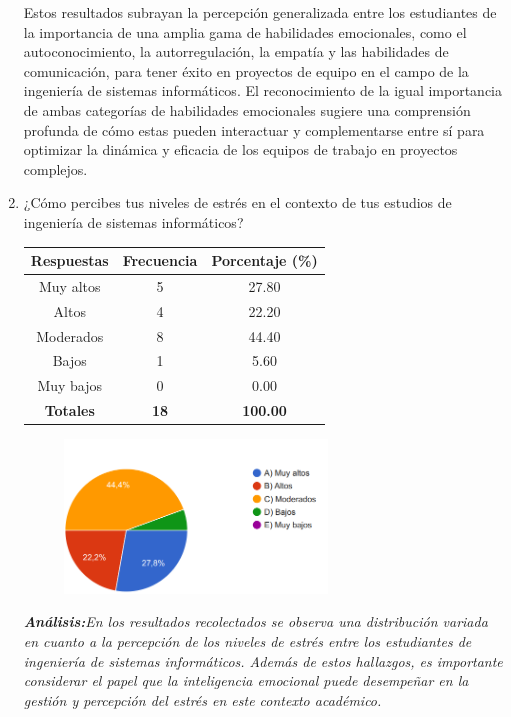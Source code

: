 \documentclass[journal]{IEEEtran}
\begin{document}
\begin{enumerate}
{Estos resultados subrayan la percepción generalizada entre los estudiantes de la importancia de una amplia gama de habilidades emocionales, como el autoconocimiento, la autorregulación, la empatía y las habilidades de comunicación, para tener éxito en proyectos de equipo en el campo de la ingeniería de sistemas informáticos.
El reconocimiento de la igual importancia de ambas categorías de habilidades emocionales sugiere una comprensión profunda de cómo estas pueden interactuar y complementarse entre sí para optimizar la dinámica y eficacia de los equipos de trabajo en proyectos complejos.
}\\

\item¿Cómo percibes tus niveles de estrés en el contexto de tus estudios de ingeniería de sistemas informáticos?
	\begin{table}[H]
		\renewcommand{\arraystretch}{1.3}
		\centering
		\begin{tabular}{|c|c|c|}
			\hline
			\textbf{Respuestas} & \textbf{Frecuencia} & \textbf{Porcentaje (\%)}\\
			\hline
			Muy altos & 5 & 27.80 \\
			Altos & 4 & 22.20 \\
			Moderados & 8 & 44.40\\
			Bajos & 1 & 5.60\\
			Muy bajos & 0 & 0.00\\
			\hline
			\textbf{Totales} &\textbf{18}& \textbf{100.00}\\
			\hline
		\end{tabular}
	\end{table}
	\begin{figure}[h]
		\centering
		\includegraphics[width=07cm]{Pregunta11}
	\end{figure}
	\textit{\textbf{Análisis:}En los resultados recolectados se observa una distribución variada en cuanto a la percepción de los niveles de estrés entre los estudiantes de ingeniería de sistemas informáticos. Además de estos hallazgos, es importante considerar el papel que la inteligencia emocional puede desempeñar en la gestión y percepción del estrés en este contexto académico.
}
\end{enumerate}
\end{document}
